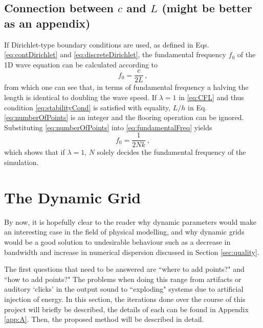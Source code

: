 \documentclass[dvipsnames, reprint]{JASA}
\def\SWcomment[#1]{\textcolor{Bittersweet}{#1}}
\begin{document}
\subsection{Connection between $c$ and $L$ \SWcomment[(might be better as an appendix)]}\label{sec:f0}
If Dirichlet-type boundary conditions are used, as defined in Eqs. \eqref{eq:contDirichlet} and \eqref{eq:discreteDirichlet}, the fundamental frequency $f_0$ of the 1D wave equation can be calculated according to
\begin{equation}
    f_0 = \frac{c}{2L}\,,
\end{equation}
from which one can see that, in terms of fundamental frequency a halving the length is identical to doubling the wave speed. 
If $\lambda = 1$ in \eqref{eq:CFL} and thus condition \eqref{eq:stabilityCond} is satisfied with equality, $L/h$ in Eq. \eqref{eq:numberOfPoints} is an integer and the flooring operation can be ignored. Substituting \eqref{eq:numberOfPoints} into \eqref{eq:fundamentalFreq} yields
\begin{equation}
    f_0 = \frac{1}{2Nk}\ ,
\end{equation}
which shows that if $\lambda = 1$, $N$ solely decides the fundamental frequency of the simulation.

\section{The Dynamic Grid}
By now, it is hopefully clear to the reader why dynamic parameters would make an interesting case in the field of physical modelling, and why dynamic grids would be a good solution to undesirable behaviour such as a decrease in bandwidth and increase in numerical dispersion discussed in Section \ref{sec:quality}. %

The first questions that need to be answered are ``where to add points?" and ``how to add points?" The problems when doing this range from artifacts or auditory `clicks' in the output sound to ``exploding" systems due to artificial injection of energy. In this section, the iterations done over the course of this project will briefly be described, the details of each can be found in Appendix \ref{app:A}. Then, the proposed method will be described in detail.

\end{document}

